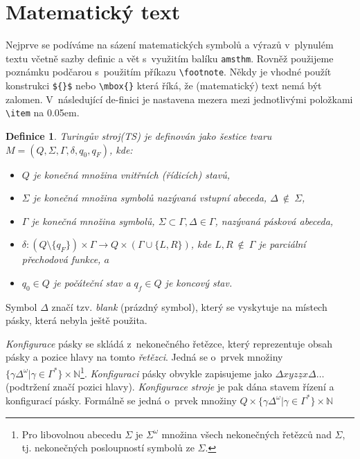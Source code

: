 \documentclass[11pt,a4paper,twocolumn]{article}
\newtheorem{definice}{Definice}
\begin{document}
\section{Matematický text}
Nejprve se podíváme na sázení matematických symbolů a výrazů v~plynulém textu včetně sazby definic a vět s~využitím balíku \texttt{amsthm}. Rovněž použijeme poznámku podčarou s~použitím příkazu \verb|\footnote|. Někdy je vhodné použít konstrukci \verb|${}$| nebo \verb|\mbox{}| která říká, že (matematický) text nemá být zalomen. V~následující de-finici je nastavena mezera mezi jednotlivými položkami \verb|\item| na 0.05em.
\begin{definice}
\label{TS}
\emph{Turingův stroj(TS)} je definován jako \emph{šestice} tvaru $ M = (Q,\Sigma,\Gamma,\delta,q_0,q_F)$, kde:
\begin{itemize}
  \setlength\itemsep{0.05em}
  \item [$\bullet$] $Q$ je konečná množina vnitřních (řídicích) stavů,\\
  \item [$\bullet$] $\Sigma$ je konečná množina symbolů nazývaná vstupní abeceda, $\Delta\ {\not \in}\ \Sigma$,\\
  \item [$\bullet$] $\Gamma$ je konečná množina symbolů, $\Sigma \subset \Gamma, \Delta \in \Gamma$, nazývaná pásková abeceda,\\
  \item [$\bullet$] $\delta : (Q \setminus \{q_F\})\times\Gamma\rightarrow Q\times(\Gamma\cup\{L,R\})$, kde $L,R\ {\not \in}\   \Gamma$ je parciální přechodová funkce, $a$\\
  \item [$\bullet$] $q_0 \in Q$ je počáteční stav a $q_f \in Q$ je koncový stav.\\
  \end{itemize}
  \end{definice}

  Symbol $\Delta$ značí tzv. \textit{blank} (prázdný symbol), který se vyskytuje na místech pásky, která nebyla ještě použita.

  \textit{Konfigurace} pásky se skládá z~nekonečného řetězce, který reprezentuje obsah pásky a pozice hlavy na tomto \textit{řetězci}. Jedná se o~prvek množiny ${\{\gamma\Delta^\omega|\gamma\in\Gamma^*\} \times \mathbb{N}}$\footnote{Pro libovolnou abecedu $\Sigma$ je $\Sigma^\omega$ množina všech nekonečných řetězců nad $\Sigma$, tj. nekonečných posloupností symbolů ze $\Sigma$.}. \textit{Konfiguraci} pásky obvykle zapisujeme jako $\Delta xyz\underline{z}x\Delta\dots$ (podtržení značí pozici hlavy). \textit{Konfigurace stroje} je pak dána stavem řízení a konfigurací pásky. Formálně se jedná o~prvek množiny $Q \times \{\gamma\Delta^\omega|\gamma\in\Gamma^*\} \times \mathbb{N}$
\end{document}
